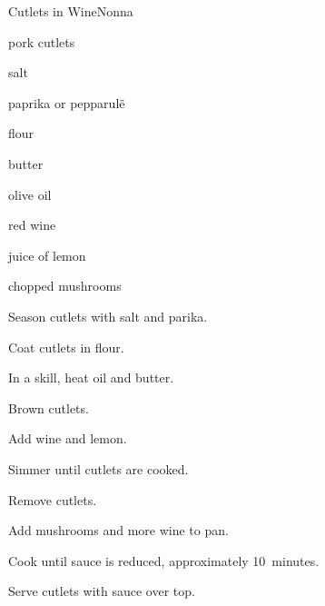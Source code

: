 \begin{recipe}{Cutlets in Wine}{Nonna}{}

\begin{ingredients}
\item pork cutlets
\item salt
\item paprika or pepparul\"e
\item flour
\item butter
\item olive oil
\item red wine
\item juice of \half lemon
\item chopped mushrooms
\end{ingredients}

\begin{directions}
\item Season cutlets with salt and parika.
\item Coat cutlets in flour.
\item In a skill, heat oil and butter.
\item Brown cutlets.
\item Add wine and lemon.
\item Simmer until cutlets are cooked.
\item Remove cutlets.
\item Add mushrooms and more wine to pan.
\item Cook until sauce is reduced, approximately 10~minutes.
\item Serve cutlets with sauce over top.
\end{directions}

\end{recipe}
